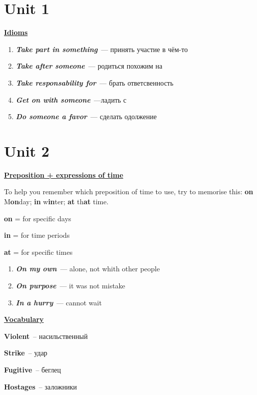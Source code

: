 \documentclass[10pt,a4paper]{article}
\begin{document}
\twocolumn[]


\section{Unit 1}
\textbf{\underline{Idioms}}

\begin{enumerate}
  \item \textit{\textbf{Take part in something}}~--- принять участие в чём-то
  \item \textit{\textbf{Take after someone}}~--- родиться похожим на
  \item \textit{\textbf{Take responsability for}}~--- брать ответсвенность
  \item \textit{\textbf{Get on with someone}}~---ладить с
  \item \textit{\textbf{Do someone a favor}}~--- сделать одолжение
\end{enumerate}




\section{Unit 2}

\textbf{\underline{Preposition + expressions of time}}

To help you remember which preposition of time to use, try to memorise this: \textbf{on} M\textbf{on}day; \textbf{in} w\textbf{in}ter; \textbf{at} th\textbf{at} time. 

\textbf{on} = for specific days

\textbf{in} = for time periods

\textbf{at} = for specific times

\begin{enumerate}
  \item \textit{\textbf{On my own}}~--- alone, not whith other people
  \item \textit{\textbf{On purpose}}~--- it was not mistake
  \item \textit{\textbf{In a hurry}}~--- cannot wait
\end{enumerate}

\textbf{\underline{Vocabulary}}

\textbf{Violent}~-- насильственный

\textbf{Strike}~-- удар

\textbf{Fugitive}~-- беглец

\textbf{Hostages}~-- заложники
\end{document}
